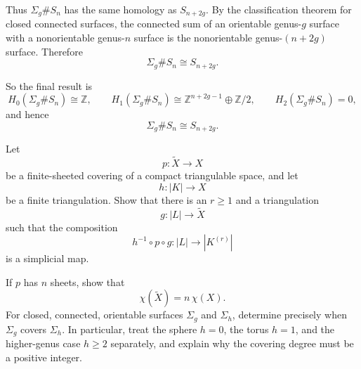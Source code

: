 \begin{solution}
Thus \(\Sigma_g\# S_n\) has the same homology as \(S_{n+2g}\). By the classification theorem for closed connected surfaces, the connected sum of an orientable genus-\(g\) surface with a nonorientable genus-\(n\) surface is the nonorientable genus-\((n+2g)\) surface. Therefore
\[
\Sigma_g\# S_n\cong S_{n+2g}.
\]

So the final result is
\[
H_0(\Sigma_g\# S_n)\cong \mathbb Z,
\qquad
H_1(\Sigma_g\# S_n)\cong \mathbb Z^{n+2g-1}\oplus \mathbb Z/2,
\qquad
H_2(\Sigma_g\# S_n)=0,
\]
and hence
\[
\boxed{\Sigma_g\# S_n\cong S_{n+2g}.}
\]
\end{solution}

\begin{problem}
Let
\[
p:\widetilde X \to X
\]
be a finite-sheeted covering of a compact triangulable space, and let
\[
h:|K|\to X
\]
be a finite triangulation. Show that there is an \(r\ge 1\) and a triangulation
\[
g:|L|\to \widetilde X
\]
such that the composition
\[
h^{-1}\circ p\circ g:|L|\to |K^{(r)}|
\]
is a simplicial map.

If \(p\) has \(n\) sheets, show that
\[
\chi(\widetilde X)=n\,\chi(X).
\]
For closed, connected, orientable surfaces \(\Sigma_g\) and \(\Sigma_h\), determine precisely when \(\Sigma_g\) covers \(\Sigma_h\). In particular, treat the sphere \(h=0\), the torus \(h=1\), and the higher-genus case \(h\ge 2\) separately, and explain why the covering degree must be a positive integer.

\par
\end{problem}

